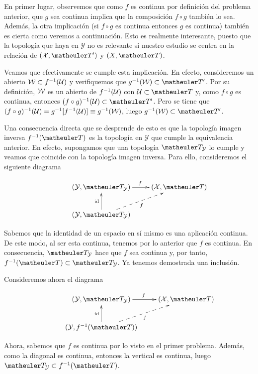 En primer lugar, observemos que como $f$ es continua por definición del problema anterior, que $g$ sea continua implica que la composición $f\circ g$ también lo sea. Además, la otra implicación (si $f\circ g$ es continua entonces $g$ es continua) también es cierta como veremos a continuación. Esto es realmente interesante, puesto que la topología que haya en $\mathcal{Y}$ no es relevante si nuestro estudio se centra en la relación de $(\mathcal{X},\T')$ y $(X,\T)$.

Veamos que efectivamente se cumple esta implicación. En efecto, consideremos un abierto $\mathcal{W}\subset f^{-1}(\mathcal{U})$ y verifiquemos que $g^{-1}(\W)\subset \T'$. Por su definición, $\mathcal{W}$ es un abierto de $f^{-1}(\mathcal{U})$ con $\U\subset \T$ y, como $f\circ g$ es continua, entonces $(f\circ g)^{-1}(\U)\subset \T'$. Pero se tiene que $(f\circ g)^{-1}(\mathcal{U})=g^{-1}[f^{-1}(\mathcal{U})]\equiv g^{-1}(\mathcal{W})$, luego $g^{-1}(\W)\subset \T'$.

Una consecuencia directa que se desprende de esto es que la topología imagen inversa $f^{-1}(\T)$ es la topología en $\mathcal{Y}$ que cumple la equivalencia anterior. En efecto, supongamos que una topología $\T_\mathcal{Y}$ lo cumple y veamos que coincide con la topología imagen inversa. Para ello, consideremos el siguiente diagrama

\begin{equation*}
\xymatrix{
	&(\mathcal{Y},\T_{\mathcal{Y}}) \ar[r]^f
	&(\mathcal{X},\T) \\
	&(\mathcal{Y},\T_{\mathcal{Y}}) \ar@{-->}[ru]_f \ar[u]^{\text{id}}}
\end{equation*}

Sabemos que la identidad de un espacio en sí mismo es una aplicación continua. De este modo, al ser esta continua, tenemos por lo anterior que $f$ es continua. En consecuencia, $\T_{\mathcal{Y}}$ hace que $f$ sea continua y, por tanto, $f^{-1}(\T)\subset \T_{\mathcal{Y}}$. Ya tenemos demostrada una inclusión.

Consideremos ahora el diagrama 

\begin{equation*}
\xymatrix{
	&(\mathcal{Y},\T_{\mathcal{Y}}) \ar[r]^f
	&(\mathcal{X},\T) \\
	&(\mathcal{Y},f^{-1}(\T)) \ar@{-->}[ru]_f \ar[u]^{\text{id}}}
\end{equation*}

Ahora, sabemos que $f$ es continua por lo visto en el primer problema. Además, como la diagonal es continua, entonces la vertical es continua, luego $\T_{\mathcal{\Y}} \subset f^{-1}(\T)$.

